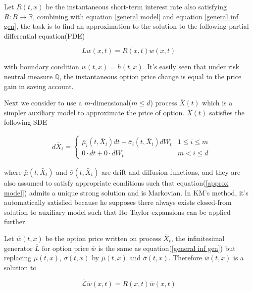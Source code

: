 Let $R(t,x)$ be the instantaneous short-term interest rate also satisfying $R: B \rightarrow \mathbb R$, combining with equation \eqref{general model} and equation \eqref{general inf gen}, the task is to find an approximation to the solution to the following partial differential equation(PDE)

\begin{equation}\label{pde under general}
    Lw(x,t) = R(x,t)w(x,t)
\end{equation}

\noindent with boundary condition $w(t,x) = h(t,x)$. It's easily seen that under risk neutral measure $\mathbb Q$, the instantaneous option price change is equal to the price gain in saving account. 

Next we consider to use a $m$-dimensional($m \leq d$) process $\bar{X}(t)$ which is a simpler auxiliary model to approximate the price of option. $\bar{X}(t)$ satisfies the following SDE

\begin{equation}\label{approx model}
    \begin{aligned}
        &d\bar{X}_t= \begin{cases}   \bar{\mu}_i(t, \bar{X}_t) dt + \bar{\sigma}_i(t, \bar{X}_t) dW_t & 1 \leq i \leq m \\
        0 \cdot dt + 0 \cdot dW_t & m < i \leq d \end{cases}
        \end{aligned}
\end{equation}

\noindent where $\bar{\mu}(t, \bar{X}_t)$ and $\bar{\sigma}(t, \bar{X}_t)$ are drift and diffusion functions, and they are also assumed to satisfy appropriate conditions such that equation(\ref{approx model}) admits a unique strong solution and is Markovian. In KM's method, it's automatically satisfied because he supposes there always exists closed-from solution to auxiliary model such that Ito-Taylor expansions can be applied further.

Let $\bar{w}(t,x)$ be the option price written on process $\bar{X}_t$, the infinitesimal generator $\bar{L}$ for option price $\bar{w}$ is the same as equation(\ref{general inf gen}) but replacing $\mu(t,x)$, $\sigma(t,x)$ by $\bar{\mu}(t,x)$ and $\bar{\sigma}(t,x)$. Therefore $\bar{w}(t,x)$ is a solution to

\begin{equation}\label{pde under approx}
    \mathcal{\bar{L}}\bar{w}(x,t) = R(x,t)\bar{w}(x,t)
\end{equation}

